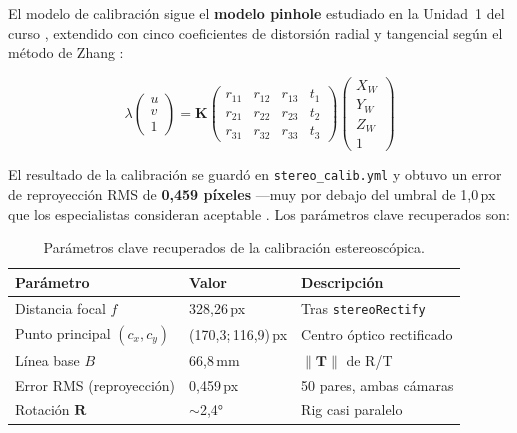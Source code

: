 \documentclass[12pt, a4paper]{article}
\begin{document}
El modelo de calibración sigue el \textbf{modelo pinhole} estudiado en la Unidad~1
del curso \cite{robles2026unidad1}, extendido con cinco coeficientes de distorsión
radial y tangencial según el método de Zhang \cite{zhang2000flexible}:

\begin{equation}
\label{eq:proj}
  \lambda \begin{pmatrix} u \\ v \\ 1 \end{pmatrix}
  = \mathbf{K}
  \begin{pmatrix} r_{11} & r_{12} & r_{13} & t_1 \\
                  r_{21} & r_{22} & r_{23} & t_2 \\
                  r_{31} & r_{32} & r_{33} & t_3 \end{pmatrix}
  \begin{pmatrix} X_W \\ Y_W \\ Z_W \\ 1 \end{pmatrix}
\end{equation}

El resultado de la calibración se guardó en \texttt{stereo\_calib.yml} y obtuvo un
error de reproyección RMS de \textbf{0,459 píxeles} —muy por debajo del umbral de
1,0\,px que los especialistas consideran aceptable \cite{szeliski2022computer}. Los
parámetros clave recuperados son:

\begin{table}[htbp]
\centering
\caption{Parámetros clave recuperados de la calibración estereoscópica.}
\label{tab:calib}
\begin{tabular}{l l p{4.5cm}}
\toprule
\textbf{Parámetro}              & \textbf{Valor}        & \textbf{Descripción} \\
\midrule
Distancia focal $f$             & 328,26\,px            & Tras \texttt{stereoRectify} \\
Punto principal $(c_x,c_y)$     & (170,3;\,116,9)\,px   & Centro óptico rectificado \\
Línea base $B$                  & 66,8\,mm              & $\lVert\mathbf{T}\rVert$ de R/T \\
Error RMS (reproyección)        & 0,459\,px             & 50 pares, ambas cámaras \\
Rotación $\mathbf{R}$           & $\sim$2,4°            & Rig casi paralelo \\
\bottomrule
\end{tabular}
\end{table}
\end{document}
